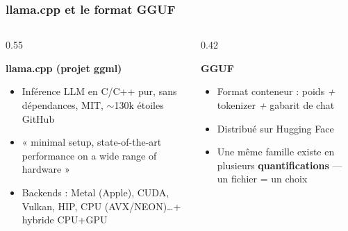 \documentclass[
	11pt,
	aspectratio=169
]{beamer}
\begin{document}
\begin{frame}
    \frametitle{llama.cpp et le format GGUF}
    \begin{columns}[t]
        \begin{column}{0.55\textwidth}
            \begin{block}{\centering \textbf{llama.cpp (projet ggml)}}
                \begin{itemize}\setlength\itemsep{0.3em}
                    \item Inférence LLM en C/C++ pur, sans dépendances, MIT, $\sim$130k étoiles GitHub
                    \item « minimal setup, state-of-the-art performance on a wide range of hardware »
                    \item Backends : Metal (Apple), CUDA, Vulkan, HIP, CPU (AVX/NEON)\dots + hybride CPU+GPU
                \end{itemize}
            \end{block}
        \end{column}
        \begin{column}{0.42\textwidth}
            \begin{exampleblock}{\centering \textbf{GGUF}}
                \begin{itemize}\setlength\itemsep{0.3em}
                    \item Format conteneur : poids \emph{+} tokenizer \emph{+} gabarit de chat
                    \item Distribué sur Hugging Face
                    \item Une même famille existe en plusieurs \textbf{quantifications} --- un fichier = un choix
                \end{itemize}
            \end{exampleblock}
        \end{column}
    \end{columns}
\end{frame}
\end{document}
